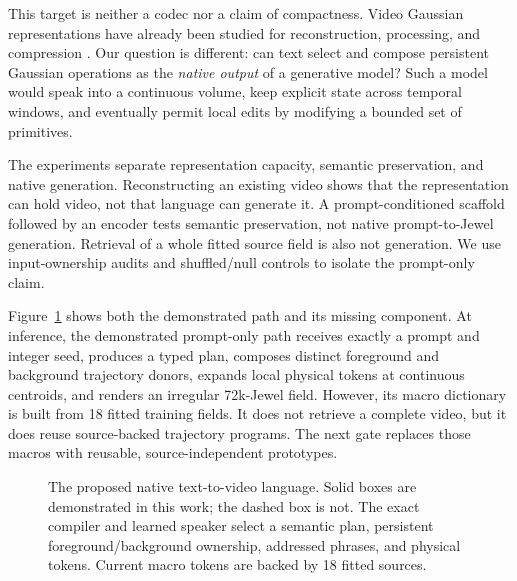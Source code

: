 \documentclass{article}
\begin{document}
This target is neither a codec nor a claim of compactness. Video Gaussian representations have
already been studied for reconstruction, processing, and compression
\cite{sun2024splatter,smolak2024vegas,wang2025gsvc,lee2025gaussianvideo,shah2026garv}. Our question is
different: can text select and compose persistent Gaussian operations as the \emph{native output}
of a generative model? Such a model would speak into a continuous volume, keep explicit state across
temporal windows, and eventually permit local edits by modifying a bounded set of primitives.

The experiments separate representation capacity, semantic preservation, and native generation.
Reconstructing an existing video shows that the representation can hold video, not that language
can generate it. A prompt-conditioned scaffold followed by an encoder tests semantic preservation,
not native prompt-to-Jewel generation. Retrieval of a whole fitted source field is also not
generation. We use input-ownership audits and shuffled/null controls to isolate the prompt-only
claim.

Figure~\ref{fig:architecture} shows both the demonstrated path and its missing component. At
inference, the demonstrated prompt-only path receives exactly a prompt and integer seed, produces a
typed plan, composes distinct foreground and background trajectory donors, expands local physical
tokens at continuous centroids, and renders an irregular 72k-Jewel field. However, its macro
dictionary is built from 18 fitted training fields. It does not retrieve a complete video, but it
does reuse source-backed trajectory programs. The next gate replaces those macros with reusable,
source-independent prototypes.

\begin{figure}[t]
  \centering
  \resizebox{0.96\textwidth}{!}{}
  \caption{The proposed native text-to-video language. Solid boxes are demonstrated in this work;
  the dashed box is not. The exact compiler and learned speaker select a semantic plan, persistent
  foreground/background ownership, addressed phrases, and physical tokens. Current macro tokens
  are backed by 18 fitted sources.}
  \label{fig:architecture}
\end{figure}
\end{document}

